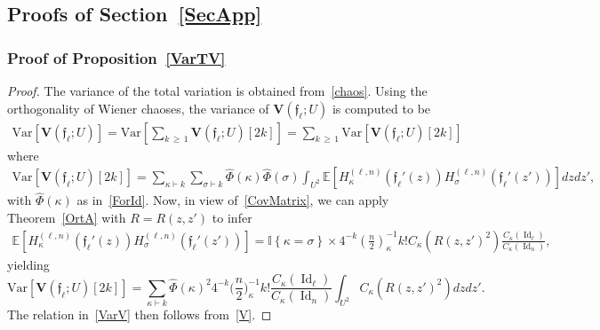 \documentclass[AHL,Unicode,longabstracts,published]{cedram}
\DeclareMathOperator{\Id}{Id}
\newcommand{\bfv}{\mathbf{V}}
\newcommand{\frkf}{\mathfrak{f}}
\newcommand{\E}[1]{\mathbb{E}\left[#1\right]}
\newcommand{\V}[1]{\mathrm{Var}{\left[#1\right]}}
\newcommand{\ind}[1]{\mathbb{I}
\left\{#1\right\}}
\begin{document}
\subsection{Proofs of Section~\ref{SecApp}}
\subsubsection*{Proof of Proposition~\ref{VarTV}}

\begin{proof}
The variance of the total variation is obtained from~\eqref{chaos}. Using the orthogonality of Wiener chaoses, the variance of $\bfv(\frkf_{\ell};U)$ is computed to be
\begin{gather}\label{V}
\V{\bfv(\frkf_{\ell};U)} = \V{\sum_{k\,\geq\,1} \bfv\left(\frkf_{\ell};U\right)[2k]} = \sum_{k\,\geq\,1} \V{\bfv\left(\frkf_{\ell};U\right)[2k]}
\end{gather}
where
\begin{gather*}
\V{\bfv(\frkf_{\ell};U)[2k]} = \sum_{\kappa \vdash k} \sum_{\sigma \vdash k} \widehat{\Phi}(\kappa)\widehat{\Phi}(\sigma) \int_{U^2} \E{H_{\kappa}^{(\ell,n)}\left(\frkf_{\ell}'(z)\right) H_{\sigma}^{(\ell,n)}\left(\frkf_{\ell}'(z')\right) }dzdz',
\end{gather*}
with $\widehat{\Phi}(\kappa)$ as in~\eqref{ForId}. Now, in view of~\eqref{CovMatrix}, we can apply Theorem~\ref{OrtA} with $R=R(z,z')$ to infer
\begin{gather*}
\E{H_{\kappa}^{(\ell,n)}\left(\frkf_{\ell}'(z)\right) H_{\sigma}^{(\ell,n)}\left(\frkf_{\ell}'(z')\right)} = \ind{\kappa=\sigma}\times 4^{-k}\left(\frac{n}{2}\right)_{\kappa}^{-1} k ! C_{\kappa}\left(R(z,z')^2\right)\frac{C_{\kappa}(\Id_{\ell})}{C_{\kappa}(\Id_n)},
\end{gather*}
yielding
\[
\V{\bfv\left(\frkf_{\ell};U\right)[2k]} = \sum_{\kappa\vdash k} \widehat{\Phi}(\kappa)^2 4^{-k}\bigg(\frac{n}{2}\bigg)_{\kappa}^{-1} k !
\frac{C_{\kappa}(\Id_{\ell})}{C_{\kappa}(\Id_n)} \int_{U^2} C_{\kappa}\left(R(z,z')^2\right) dzdz'.
\]
The relation in~\eqref{VarV} then follows from~\eqref{V}.
\end{proof}
\end{document}
